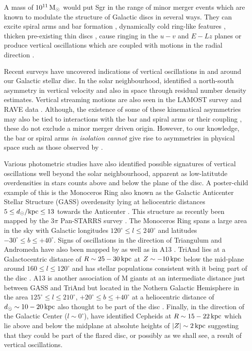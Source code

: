 \documentclass[useAMS,usenatbib]{mnras}
\begin{document}
A mass of $10^{11}\,\rm{M_{\odot}}$ would put Sgr in the range of minor merger events which are known to modulate the structure of Galactic discs in several ways. They can excite spiral arms and bar formation \citep{purcell11}, dynamically cold ring-like features \citep{younger08}, thicken pre-existing thin discs \citep{velazquez99, villalobos08, purcell10}, cause ringing in the $u-v$ and $E-Lz$ planes \citep{minchev09,gomez12} or produce vertical oscillations \citep{gomez13,widrow14,gomez16} which are coupled with motions in the radial direction \citep{d'onghia16}. 

Recent surveys have uncovered indications of vertical oscillations in and around our Galactic stellar disc. In the solar neighbourhood, \cite{widrow12} identified a north-south asymmetry in vertical velocity and also in space through residual number density estimates. Vertical streaming motions are also seen in the LAMOST survey \citep{carlin13} and RAVE data \citep{williams13}. Although, the existence of some of these kinematical asymmetries may also be tied to interactions with the bar and spiral arms \citep{monari15,monari16} or their coupling \citep{monari16b}, these do not exclude a minor merger driven origin. However, to our knowledge, the bar or spiral arms {\it in isolation cannot} give rise to asymmetries in physical space such as those observed by \cite{widrow12}.

Various photometric studies have also identified possible signatures of vertical oscillations well beyond the solar neighbourhood, apparent as low-latitutde overdensities in stars counts above and below the plane of the disc. A poster-child example of this is the Monoceros Ring also known as the Galactic Anticenter Stellar Structure (GASS) overdensity lying at heliocentric distances $5\leq d_{\odot}/{\rm{kpc}}\leq13$ towards the Anticenter  \citep{newberg03,ibata03,crane03}. This structure as recently been mapped by the $3\pi$ Pan-STARRS survey \citep{slater14, morganson16}. The Monoceros Ring spans a large area in the sky with Galactic longitudes $120^{\circ}\leq l\leq240^{\circ}$ and latitudes $-30^{\circ}\leq b \leq +40^{\circ}$. Signs of oscillations in the direction of Triangulum and Andromeda \citep{martin07} have also been mapped by \cite{xu15} as well as in A13 \citep{li17}. TriAnd lies at a Galactocentric distance of $R\sim25-30\,\rm{kpc}$ at $Z\sim -10\,\rm{kpc}$ below the mid-plane around $160\leq l \leq120^{\circ}$ \citep{sheffield14} and has stellar populations consistent with it being part of the disc \citep{price-whelan15}. A13 \citep{sharma10} is another association of M giants at an intermediate distance just between GASS and TriAnd but located in the Nothern Galactic Hemisphere in the area $125^{\circ}\leq l \leq210^{\circ}$, $+20^{\circ}\leq b \leq +40^{\circ}$ at a heliocentric distance of $d_{\odot}\sim 10-20\,\rm{kpc}$ also thought to be part of the disc \citep{li17}. Finally, in the direction of the Galactic Center ($l\sim0^{\circ}$), \cite{feast14} have identified Cepheids at $R\sim15-22 \,\rm{kpc}$ which lie above and below the midplane at absolute heights of $|Z|\sim2\,\rm{kpc}$ suggesting that they could be part of the flared disc, or possibly as we shall see, a result of vertical oscillations.
\end{document}
